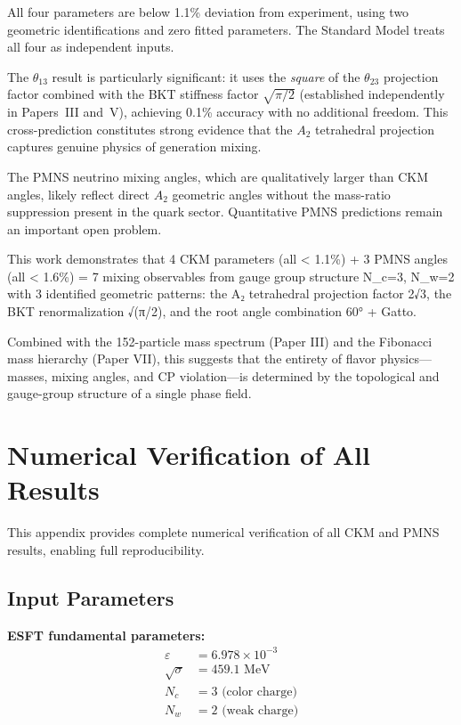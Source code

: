 ﻿\documentclass[prd,twocolumn,showpacs,superscriptaddress,groupedaddress]{revtex4-2}
\begin{document}
All four parameters are below 1.1\% deviation from experiment, using two geometric identifications and zero fitted parameters. The Standard Model treats all four as independent inputs.

The $\theta_{13}$ result is particularly significant: it uses the \emph{square} of the $\theta_{23}$ projection factor combined with the BKT stiffness factor $\sqrt{\pi/2}$ (established independently in Papers~III and~V), achieving 0.1\% accuracy with no additional freedom. This cross-prediction constitutes strong evidence that the $A_2$ tetrahedral projection captures genuine physics of generation mixing.

The PMNS neutrino mixing angles, which are qualitatively larger than CKM angles, likely reflect direct $A_2$ geometric angles without the mass-ratio suppression present in the quark sector. Quantitative PMNS predictions remain an important open problem.

This work demonstrates that 4 CKM parameters (all < 1.1\%) + 3 PMNS angles (all < 1.6\%) = 7 mixing observables from gauge group structure N_c=3, N_w=2 with 3 identified geometric patterns: the A₂ tetrahedral projection factor 2√3, the BKT renormalization √(π/2), and the root angle combination 60° + Gatto.

Combined with the 152-particle mass spectrum (Paper III) and the Fibonacci mass hierarchy (Paper VII), this suggests that the entirety of flavor physics---masses, mixing angles, and CP violation---is determined by the topological and gauge-group structure of a single phase field.

\appendix

\section{Numerical Verification of All Results}

This appendix provides complete numerical verification of all CKM and PMNS results, enabling full reproducibility.

\subsection{Input Parameters}

\textbf{ESFT fundamental parameters:}
\begin{align}
\varepsilon &= 6.978 \times 10^{-3} \\
\sqrt{\sigma} &= 459.1 \text{ MeV} \\
N_c &= 3 \text{ (color charge)} \\
N_w &= 2 \text{ (weak charge)}
\end{align}
\end{document}
